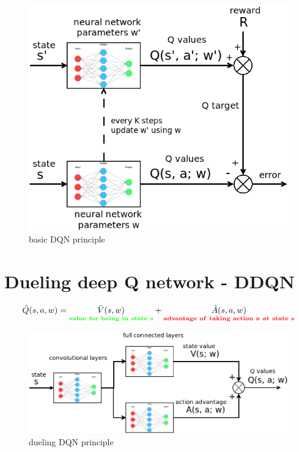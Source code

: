 \documentclass[10pt,a4paper]{article}
\begin{document}
\begin{figure}[!htb]
  \centering
  \includegraphics[scale=0.3]{../../diagrams/dqn.png}
  \caption{basic DQN principle}
  \label{img:dqn}
\end{figure}

\section{Dueling deep Q network - DDQN}

\begin{align}
  \hat{Q}(s, a, w) = \underset{\bf \color{green} value\ for\ being\ in\ state\ s}{\hat{V}(s, w)} + \underset{\bf \color{red} advantage\ of\ taking\ action\ a\ at\ state\ s}{\hat{A}(s, a, w)}
\end{align}


\begin{figure}[!htb]
  \centering
  \includegraphics[scale=0.3]{../../diagrams/dueling_dqn_0.png}
  \caption{dueling DQN principle}
  \label{img:ddqn_principle}
\end{figure}
\end{document}
